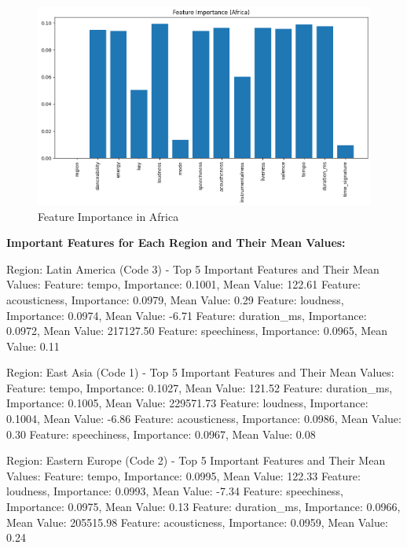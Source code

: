\begin{figure}[h]
    \centering
    \begin{minipage}{0.45\textwidth}
        \centering
        \includegraphics[width=\linewidth]{media/rf_feature_imp_africa.png}
        \caption{Feature Importance in Africa}
    \end{minipage}
\end{figure}

\clearpage 

\textbf{Important Features for Each Region and Their Mean Values:}

Region: Latin America (Code 3) - Top 5 Important Features and Their Mean Values:
Feature: tempo, Importance: 0.1001, Mean Value: 122.61
Feature: acousticness, Importance: 0.0979, Mean Value: 0.29
Feature: loudness, Importance: 0.0974, Mean Value: -6.71
Feature: duration\_ms, Importance: 0.0972, Mean Value: 217127.50
Feature: speechiness, Importance: 0.0965, Mean Value: 0.11

Region: East Asia (Code 1) - Top 5 Important Features and Their Mean Values:
Feature: tempo, Importance: 0.1027, Mean Value: 121.52
Feature: duration\_ms, Importance: 0.1005, Mean Value: 229571.73
Feature: loudness, Importance: 0.1004, Mean Value: -6.86
Feature: acousticness, Importance: 0.0986, Mean Value: 0.30
Feature: speechiness, Importance: 0.0967, Mean Value: 0.08

Region: Eastern Europe (Code 2) - Top 5 Important Features and Their Mean Values:
Feature: tempo, Importance: 0.0995, Mean Value: 122.33
Feature: loudness, Importance: 0.0993, Mean Value: -7.34
Feature: speechiness, Importance: 0.0975, Mean Value: 0.13
Feature: duration\_ms, Importance: 0.0966, Mean Value: 205515.98
Feature: acousticness, Importance: 0.0959, Mean Value: 0.24

